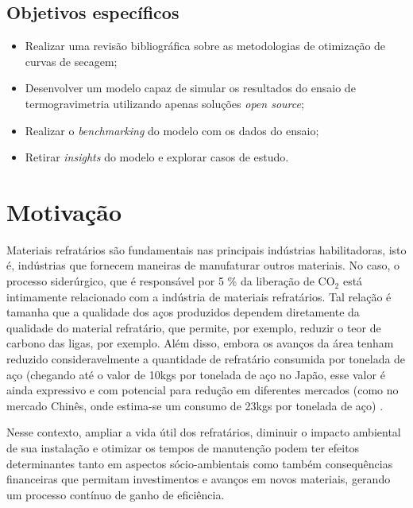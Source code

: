     \subsection{Objetivos específicos}
        
    \begin{itemize}
        \item Realizar uma revisão bibliográfica sobre as metodologias de otimização de curvas de secagem;
        
        \item Desenvolver um modelo capaz de simular os resultados do ensaio de termogravimetria utilizando apenas soluções \textit{open source};
        
        \item Realizar o \textit{benchmarking} do modelo com os dados do ensaio;
        
        \item Retirar \textit{insights} do modelo e explorar casos de estudo.
    \end{itemize}
        
\section{Motivação}
   Materiais refratários são fundamentais nas principais indústrias
   habilitadoras, isto é, indústrias que fornecem maneiras de manufaturar outros
   materiais. No caso, o processo siderúrgico, que é responsável por 5 \% \cite{Davis2018} da
   liberação de CO$_2$  está intimamente relacionado com a
   indústria de materiais refratários. Tal relação é tamanha que a qualidade dos
   aços produzidos dependem diretamente da qualidade do material refratário, que
   permite, por exemplo, reduzir  o teor de carbono das ligas, por exemplo. Além disso, embora os avanços da
   área tenham reduzido consideravelmente a quantidade de refratário consumida
   por tonelada de aço (chegando até o valor de 10kgs por tonelada de aço no Japão, esse valor é ainda expressivo e com potencial para redução em diferentes mercados (como no mercado Chinês, onde estima-se um consumo de 23kgs por tonelada de aço)  \cite{refperton}.

   Nesse contexto, ampliar a vida útil dos refratários, diminuir o impacto
   ambiental de sua instalação e otimizar os tempos de manutenção podem ter
   efeitos determinantes tanto em aspectos sócio-ambientais como também
   consequências financeiras que permitam investimentos e avanços em novos
   materiais, gerando um processo contínuo de ganho de eficiência.


